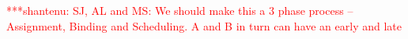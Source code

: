 \documentclass[conference,final]{IEEEtran}
\newcommand{\jhanote}[1]{ {\textcolor{red} { ***shantenu: #1 }}}
\newcommand{\alnote}[1]{ {\textcolor{blue} { ***andre: #1 }}}
\newcommand{\alnote}[1]{}
\newcommand{\jhanote}[1]{}
\begin{document}


\jhanote{SJ, AL and MS: We should make this a 3 phase process --
  Assignment, Binding and Scheduling. A and B in turn can have an
  early and late}





\end{document}
